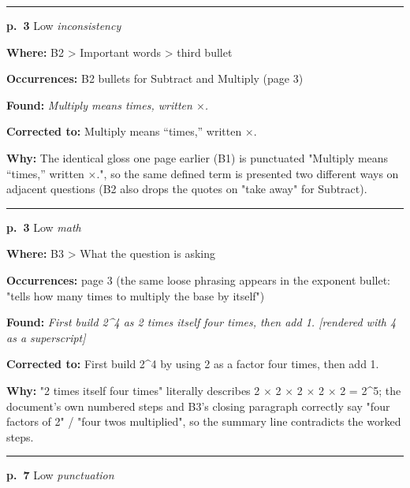 \documentclass[11pt]{article}
\newcommand{\sevlow}[1]{\textcolor{black!55}{#1}}
\begin{document}
\noindent\rule{\textwidth}{0.4pt}\par\nobreak\vspace{2pt}
\noindent\textbf{p.~3} \quad \sevlow{Low} \quad \textit{inconsistency}\par
\noindent\textbf{Where: }B2 > Important words > third bullet\par
\noindent\textbf{Occurrences: }B2 bullets for Subtract and Multiply (page 3)\par
\noindent\textbf{Found: }\textit{Multiply means times, written $\times$.}\par
\noindent\textbf{Corrected to: }Multiply means ``times,'' written $\times$.\par
\noindent\textbf{Why: }The identical gloss one page earlier (B1) is punctuated "Multiply means ``times,'' written $\times$.", so the same defined term is presented two different ways on adjacent questions (B2 also drops the quotes on "take away" for Subtract).\par\vspace{4pt}
\noindent\rule{\textwidth}{0.4pt}\par\nobreak\vspace{2pt}
\noindent\textbf{p.~3} \quad \sevlow{Low} \quad \textit{math}\par
\noindent\textbf{Where: }B3 > What the question is asking\par
\noindent\textbf{Occurrences: }page 3 (the same loose phrasing appears in the exponent bullet: "tells how many times to multiply the base by itself")\par
\noindent\textbf{Found: }\textit{First build 2\textasciicircum{}4 as 2 times itself four times, then add 1. [rendered with 4 as a superscript]}\par
\noindent\textbf{Corrected to: }First build 2\textasciicircum{}4 by using 2 as a factor four times, then add 1.\par
\noindent\textbf{Why: }"2 times itself four times" literally describes 2 $\times$ 2 $\times$ 2 $\times$ 2 $\times$ 2 = 2\textasciicircum{}5; the document's own numbered steps and B3's closing paragraph correctly say "four factors of 2" / "four twos multiplied", so the summary line contradicts the worked steps.\par\vspace{4pt}
\noindent\rule{\textwidth}{0.4pt}\par\nobreak\vspace{2pt}
\noindent\textbf{p.~7} \quad \sevlow{Low} \quad \textit{punctuation}\par
\end{document}
